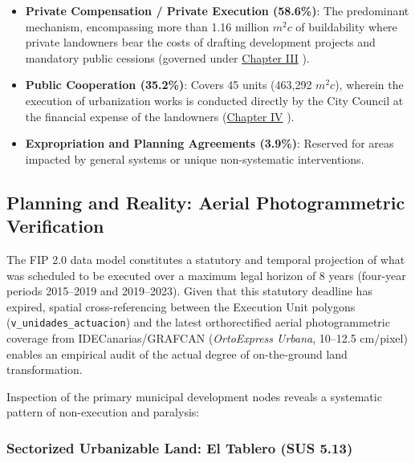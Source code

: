 \begin{table}[htbp]
  \centering
  \caption{Distribution of Execution Units by Execution System}
  \label{tab:resumen_sistemas}
  \vspace{0.2cm}
  
\end{table}

\begin{itemize}
  \item \textbf{Private Compensation / Private Execution (58.6\%)}: The predominant mechanism, encompassing more than 1.16 million $m^2c$ of buildability where private landowners bear the costs of drafting development projects and mandatory public cessions (governed under \href{https://www.boe.es/buscar/act.php?id=BOE-A-2017-10295#ci-21}{Chapter III} \cite{ley_suelo_canarias_2017}
    ).
  \item \textbf{Public Cooperation (35.2\%)}: Covers 45 units (463,292 $m^2c$), wherein the execution of urbanization works is conducted directly by the City Council at the financial expense of the landowners (\href{https://www.boe.es/buscar/act.php?id=BOE-A-2017-10295#ci-22}{Chapter IV}
    ).
  \item \textbf{Expropriation and Planning Agreements (3.9\%)}: Reserved for areas impacted by general systems or unique non-systematic interventions.
\end{itemize}

\subsection{Planning and Reality: Aerial Photogrammetric Verification}

The FIP 2.0 data model constitutes a statutory and temporal projection of what was scheduled to be executed over a maximum legal horizon of 8 years (four-year periods 2015--2019 and 2019--2023). Given that this statutory deadline has expired, spatial cross-referencing between the Execution Unit polygons (\texttt{v\_unidades\_actuacion}) and the latest orthorectified aerial photogrammetric coverage from IDECanarias/GRAFCAN (\emph{OrtoExpress Urbana}, 10--12.5 cm/pixel) enables an empirical audit of the actual degree of on-the-ground land transformation.

Inspection of the primary municipal development nodes reveals a systematic pattern of non-execution and paralysis:

\subsubsection{Sectorized Urbanizable Land: El Tablero (SUS 5.13)}

